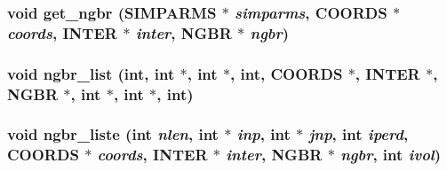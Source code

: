 \subsubsection{\setlength{\rightskip}{0pt plus 5cm}void get\_\-ngbr ({\bf SIMPARMS} $\ast$ {\em simparms}, {\bf COORDS} $\ast$ {\em coords}, {\bf INTER} $\ast$ {\em inter}, {\bf NGBR} $\ast$ {\em ngbr})}\label{ngbr__list_8c_d5f2285f100502df59bc569bbd14ba21}


\subsubsection{\setlength{\rightskip}{0pt plus 5cm}void ngbr\_\-list (int, int $\ast$, int $\ast$, int, {\bf COORDS} $\ast$, {\bf INTER} $\ast$, {\bf NGBR} $\ast$, int $\ast$, int $\ast$, int)}\label{ngbr__list_8c_0255861c2625a94eb47c75774590bafe}


\subsubsection{\setlength{\rightskip}{0pt plus 5cm}void ngbr\_\-liste (int {\em nlen}, int $\ast$ {\em inp}, int $\ast$ {\em jnp}, int {\em iperd}, {\bf COORDS} $\ast$ {\em coords}, {\bf INTER} $\ast$ {\em inter}, {\bf NGBR} $\ast$ {\em ngbr}, int {\em ivol})}\label{ngbr__list_8c_470d239b98cb6b2a68be65439274b16f}


